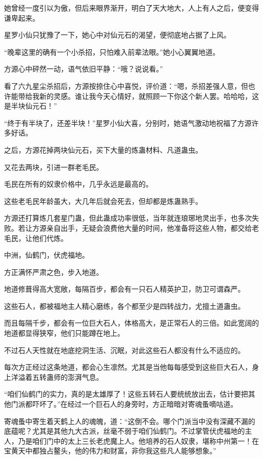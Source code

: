 \begin{this_body}
她曾经一度引以为傲，但后来眼界渐开，明白了天大地大，人上有人之后，便变得谦卑起来。

星罗小仙只犹豫了一下，她心中对仙元石的渴望，便彻底地占据了上风。

“晚辈这里的确有一个小杀招，只怕难入前辈法眼。”她小心翼翼地道。

方源心中砰然一动，语气依旧平静：“哦？说说看。”

看了六九星尘杀招后，方源按捺住心中喜悦，评价道：“嗯，杀招差强人意，但也许能带给我新的灵感。谁让我今天心情好，就照顾一下你这个新人罢。哈哈哈，这是半块仙元石！”

“终于有半块了，还差半块！”星罗小仙大喜，分别时，她语气激动地祝福了方源许多好话。

之后，方源花掉两块仙元石，买下大量的炼蛊材料、凡道蛊虫。

又花去两块，引进一群老毛民。

毛民在所有的奴隶价格中，几乎永远是最高的。

这些老毛民年龄虽大，大几年后就会死去，但却都是炼蛊熟手。

方源还打算炼几套星门蛊，但此蛊成功率很低，当年就连琅琊地灵出手，也多次失败。若让方源亲自出手，无疑会浪费他大量的时间，他准备将这些人物，都交给老毛民，让他们代炼。

中洲，仙鹤门，伏虎福地。

方正满怀严肃之色，步入地道。

地道修葺得高大宽敞，每隔百步，都会有一只石人精英护卫，防卫可谓森严。

这些石人，都被福地主人精心磨练，各个都至少是四转战力，尤擅土道蛊虫。

而且每隔千步，都会有一位巨大石人，体格高大，是正常石人的三倍。如此宽阔的地道都显得狭窄，他们只能蹲在地上。

不过石人天性就在地底挖洞生活、沉眠，对此这些石人都没有什么不适应的。

每次方正经过这条地道，都会心生凛然。尤其是当他每每感受到这些巨大石人，身上洋溢着五转蛊师的澎湃气息。

“咱们仙鹤门的实力，真的是太雄厚了！这些五转石人要统统放出去，估计要把其他门派都吓坏了。”在经过一个巨石人的身旁时，方正暗暗对寄魂蚤嘀咕道。

寄魂蚤中寄生着天鹤上人的魂魄，道：“这倒不会。哪个门派当中没有深藏不漏的底蕴呢？尤其是其他九大古派，丝毫不弱于咱们仙鹤门。不过掌管伏虎福地的主人，乃是咱们门中的太上三长老虎魔上人。他培养的石人奴隶，堪称中州第一！在宝黄天中都独占鳌头，他的伟力和财富，非你我这些凡人能够想象。”


\end{this_body}

